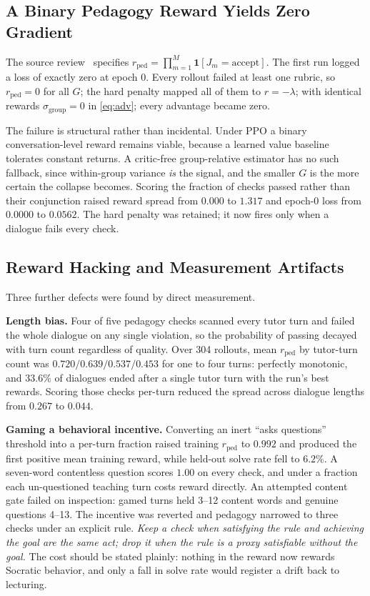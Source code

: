 \documentclass[conference]{IEEEtran}
\begin{document}
\subsection{A Binary Pedagogy Reward Yields Zero Gradient}
\label{sec:binary}

The source review~\cite{rev-pedrl} specifies
$r_{\mathrm{ped}}=\prod_{m=1}^{M}\mathbf{1}[J_m=\text{accept}]$. The first
run logged a loss of exactly zero at epoch 0. Every rollout failed at least
one rubric, so $r_{\mathrm{ped}}{=}0$ for all $G$; the hard penalty mapped
all of them to $r{=}-\lambda$; with identical rewards
$\sigma_{\text{group}}{=}0$ in \eqref{eq:adv}; every advantage became zero.

The failure is structural rather than incidental. Under PPO a binary
conversation-level reward remains viable, because a learned value baseline
tolerates constant returns. A critic-free group-relative estimator has no
such fallback, since within-group variance \emph{is} the signal, and the
smaller $G$ is the more certain the collapse becomes. Scoring the fraction of checks passed rather
than their conjunction raised reward spread from $0.000$ to $1.317$ and
epoch-0 loss from $0.0000$ to $0.0562$. The hard penalty was retained; it
now fires only when a dialogue fails every check.

\subsection{Reward Hacking and Measurement Artifacts}
\label{sec:hack}

Three further defects were found by direct measurement.

\textbf{Length bias.} Four of five pedagogy checks scanned every tutor turn
and failed the whole dialogue on any single violation, so the probability
of passing decayed with turn count regardless of quality. Over 304
rollouts, mean $r_{\mathrm{ped}}$ by tutor-turn count was
$0.720/0.639/0.537/0.453$ for one to four turns: perfectly monotonic, and
$33.6\%$ of dialogues ended after a single tutor turn with the run's best
rewards. Scoring those checks per-turn reduced the spread across dialogue
lengths from $0.267$ to $0.044$.

\textbf{Gaming a behavioral incentive.} Converting an inert ``asks
questions'' threshold into a per-turn fraction raised training
$r_{\mathrm{ped}}$ to $0.992$ and produced the first positive mean training
reward, while held-out solve rate fell to $6.2\%$. A seven-word contentless
question scores $1.00$ on every check, and under a fraction each
un-questioned teaching turn costs reward directly. An attempted content
gate failed on inspection: gamed turns held 3--12 content words and genuine
questions 4--13. The incentive was reverted and pedagogy narrowed to three
checks under an explicit rule. \emph{Keep a check when satisfying the rule
and achieving the goal are the same act; drop it when the rule is a proxy
satisfiable without the goal.} The cost should be stated plainly:
nothing in the reward now rewards Socratic behavior, and only a fall in
solve rate would register a drift back to lecturing.
\end{document}
